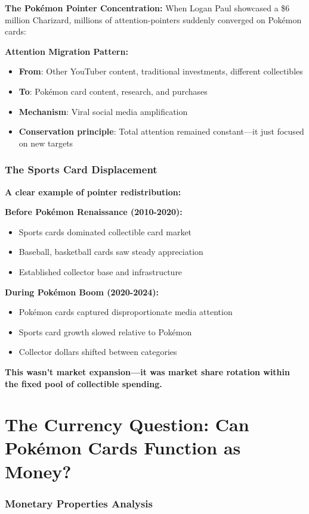 \documentclass[11pt,oneside]{book}
\begin{document}
\textbf{The Pokémon Pointer Concentration:}
When Logan Paul showcased a \$6 million Charizard, millions of attention-pointers suddenly converged on Pokémon cards:

\textbf{Attention Migration Pattern:}
\begin{itemize}
\item \textbf{From}: Other YouTuber content, traditional investments, different collectibles
\item \textbf{To}: Pokémon card content, research, and purchases
\item \textbf{Mechanism}: Viral social media amplification
\item \textbf{Conservation principle}: Total attention remained constant—it just focused on new targets
\end{itemize}

\subsubsection{The Sports Card Displacement}

\textbf{A clear example of pointer redistribution:}

\textbf{Before Pokémon Renaissance (2010-2020):}
\begin{itemize}
\item Sports cards dominated collectible card market
\item Baseball, basketball cards saw steady appreciation
\item Established collector base and infrastructure
\end{itemize}

\textbf{During Pokémon Boom (2020-2024):}
\begin{itemize}
\item Pokémon cards captured disproportionate media attention
\item Sports card growth slowed relative to Pokémon
\item Collector dollars shifted between categories
\end{itemize}

\textbf{This wasn't market expansion—it was market share rotation within the fixed pool of collectible spending.}

\section{The Currency Question: Can Pokémon Cards Function as Money?}

\subsubsection{Monetary Properties Analysis}
\end{document}
